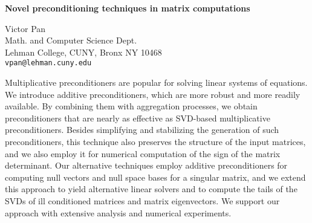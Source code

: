 \documentclass{report}
\begin{document}

\begin{center}
{\large
{\bf Novel preconditioning techniques in matrix computations}}

	Victor Pan \\
	Math. and Computer Science Dept. \\
	Lehman College, CUNY, Bronx NY 10468 \\
	{\tt vpan@lehman.cuny.edu}
\end{center}
Multiplicative preconditioners are popular for solving
linear systems of equations. We introduce additive
preconditioners, which are more robust and more readily
available. By combining them with aggregation processes, we
obtain preconditioners that are nearly as effective as
SVD-based multiplicative preconditioners. Besides
simplifying and stabilizing the generation of such
preconditioners, this technique also preserves the structure
of the input matrices, and we also employ it for numerical
computation of the sign of the matrix determinant. Our
alternative techniques employ additive preconditioners for
computing null vectors and null space bases for a singular
matrix, and we extend this approach to yield alternative
linear solvers and to compute the tails of the SVDs of ill
conditioned matrices and matrix eigenvectors. We support our
approach with extensive analysis and numerical experiments.



\end{document}
